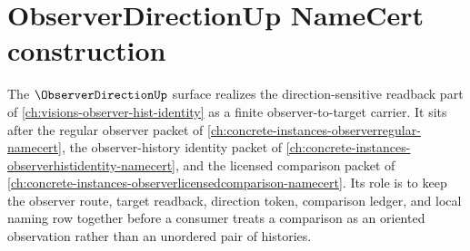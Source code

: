 \chapter{ObserverDirectionUp NameCert construction}
\label{ch:concrete-instances-observer-direction-namecert}

The $\ObserverDirectionUp$ surface realizes the direction-sensitive readback part of \autoref{ch:visions-observer-hist-identity} as a finite observer-to-target carrier. It sits after the regular observer packet of \autoref{ch:concrete-instances-observerregular-namecert}, the observer-history identity packet of \autoref{ch:concrete-instances-observerhistidentity-namecert}, and the licensed comparison packet of \autoref{ch:concrete-instances-observerlicensedcomparison-namecert}. Its role is to keep the observer route, target readback, direction token, comparison ledger, and local naming row together before a consumer treats a comparison as an oriented observation rather than an unordered pair of histories.



